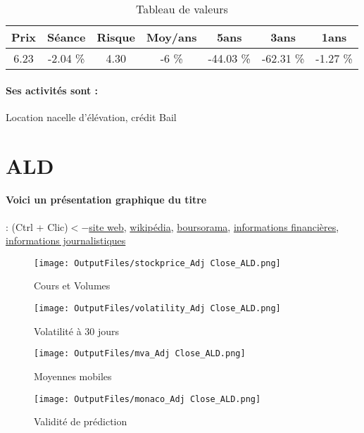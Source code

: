 \documentclass[11pt,a4paper]{report}%
\begin{document}
\begin{table}[H]
  \centering
    \begin{tabular}{|c|c|c|c|c|c|c|}
    \hline
    Prix & Séance & Risque  & Moy/ans & 5ans & 3ans & 1ans \\
    \hline
    6.23 &    -2.04 \%    & 4.30 & -6 \% & -44.03 \% & -62.31 \% & -1.27 \% \\
    \hline
    \end{tabular}%
        \label{tab:table_HAULOTTE GROUP}%
      \caption{Tableau de valeurs}
\end{table}%

\paragraph{Ses activités sont : } Location nacelle d’élévation, crédit Bail 
    
    \newpage

\section{ALD}

\paragraph{Voici un présentation graphique du titre} : (Ctrl + Clic)$<-$\href{https://www.aldautomotive.com/investors/financial-information}{site web}, \href{https://fr.wikipedia.org/wiki/ALD_Automotive}{wikipédia}, \href{https://www.boursorama.com/cours/1rPALD/}{boursorama}, \href{https://www.qwant.com/?q=site:https:%2f%2fwww.easybourse.com%2faction-societe%2fALD&t=web&client=ext-firefox-hp}{informations financières}, \href{https://bourse.lerevenu.com/cours-de-bourse/fiche-valeur-synthese/ALD/ALD-FR}{informations journalistiques}
\begin{figure}[!htb]
   \begin{minipage}{0.5\textwidth}
     \centering
     \texttt{[image: OutputFiles/stockprice\_Adj Close\_ALD.png]}
     \caption{Cours et Volumes}\label{Fig:price_ALD}
   \end{minipage}\hfill
   \begin{minipage}{0.5\textwidth}
     \centering
     \texttt{[image: OutputFiles/volatility\_Adj Close\_ALD.png]}
     \caption{Volatilité à 30 jours}\label{Fig:volat_ALD}
   \end{minipage}
\end{figure}
\begin{figure}[!htb]
   \begin{minipage}{0.5\textwidth}
     \centering
     \texttt{[image: OutputFiles/mva\_Adj Close\_ALD.png]}
     \caption{Moyennes mobiles}\label{Fig:mva_ALD}
   \end{minipage}\hfill
   \begin{minipage}{0.5\textwidth}
     \centering
     \texttt{[image: OutputFiles/monaco\_Adj Close\_ALD.png]}
     \caption{Validité de prédiction}\label{Fig:prediction_ALD}
   \end{minipage}
\end{figure}
\end{document}
